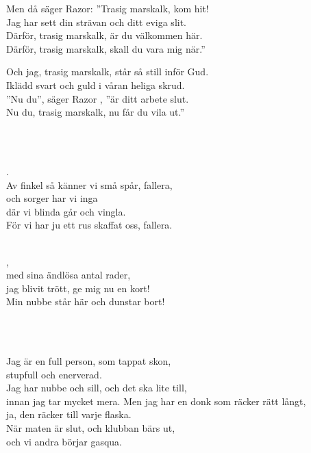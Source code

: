 Men då säger Razor: ”Trasig marskalk, kom hit!\\
Jag har sett din strävan och ditt eviga slit.\\
Därför, trasig marskalk, är du välkommen här.\\
Därför, trasig marskalk, skall du vara mig när.”

Och jag, trasig marskalk, står så still inför Gud.\\
Iklädd svart och guld i våran heliga skrud.\\
”Nu du”, säger Razor , ”är ditt arbete slut.\\
Nu du, trasig marskalk, nu får du vila ut.”

 \\


 \\       
\author{Text: Janne Weijnitz }

.\\
Av finkel så känner vi små spår, fallera,\\
och sorger har vi inga\\
där vi blinda går och vingla.\\
För vi har ju ett rus skaffat oss, fallera.\\


 \\       
\author{Text: CAlle Almquist}

,\\
med sina ändlösa antal rader,\\
jag blivit trött, ge mig nu en kort!\\
Min nubbe står här och dunstar bort!

\\

 \\       

\songtext{} 
Jag är en full person, som tappat skon,\\ 
stupfull och enerverad.\\ 
Jag har nubbe och sill, och det ska lite till,\\ 
innan jag tar mycket mera.
\newpage
Men jag har en donk som räcker rätt långt,\\ 
ja, den räcker till varje flaska.\\ 
När maten är slut, och klubban bärs ut,\\ 
och vi andra börjar gasqua. 

